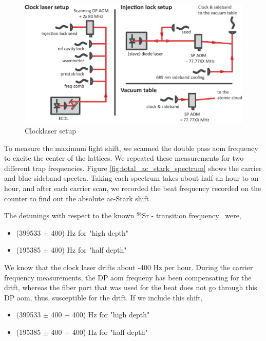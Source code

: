 		\begin{figure}
		    \centering
		    \includegraphics[scale=0.8]{figures/clocklaser_setup.pdf}
		    \caption{Clocklaser setup}
		    \label{fig:clocklaser setup}
		\end{figure}

			To measure the maximum light shift, we scanned the double pass aom frequency to excite the center of the lattices. We repeated these measurements for two different trap frequencies. Figure \ref{fig:total_ac_stark_spectrum} shows the carrier and blue sideband spectra. Taking each spectrum takes about half an hour to an hour, and after each carrier scan, we recorded the beat frequency recorded on the counter to find out the absolute ac-Stark shift.

			The detunings with respect to the known $^{\text{88}}{\text{Sr}}$ \SSZ - \TPZ transition frequency~\cite{sansonetti10} were,


			\begin{itemize}
			  \item (399533 $\pm$ 400) Hz for "high depth"
			  \item (195385 $\pm$ 400) Hz for "half depth"
			\end{itemize}


			We know that the clock laser drifts about -400 Hz per hour. During the carrier frequency measurements, the DP aom frequeny has been compensating for the drift, whereas the fiber port that was used for the beat does not go through this DP aom, thus, susceptible for the drift. If we include this shift, 

			\begin{itemize}
			  \item (399533 $\pm$ 400 + 400) Hz for "high depth"
			  \item (195385 $\pm$ 400 + 400) Hz for "half depth"
			\end{itemize}

